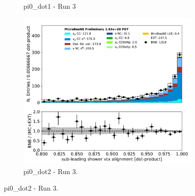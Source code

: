 \documentclass[a4paper]{article}
\begin{document}
\begin{figure}[H]
\begin{center}
\begin{subfigure}[b]{0.3\textwidth}
    \caption{\label{fig:pi0:inputs:dot1:RUN3} pi0\_dot1 - Run 3 }
    \end{subfigure}
    \begin{subfigure}[b]{0.3\textwidth}
    \centering
    \includegraphics[width=1.00\textwidth]{pi0/pi0_dot2_01152020_inputs_RUN3.pdf}
    \caption{\label{fig:pi0:inputs:dot2:RUN3} pi0\_dot2 - Run 3.}
    \end{subfigure}
\end{center}
\end{figure}
\end{document}
